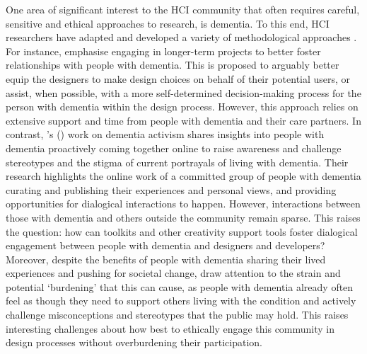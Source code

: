 One area of significant interest to the HCI community that often requires careful, sensitive and ethical approaches to research, is dementia. To this end, HCI researchers have adapted and developed a variety of methodological approaches \citep{brankaert_intersections_2019,dixon_approach_2020,houben_foregrounding_2019,unbehaun_facilitating_2018,wallace_design-led_2013}. For instance, \cite{hendriks_challenges_2014} emphasise engaging in longer-term projects to better foster relationships with people with dementia. This is proposed to arguably better equip the designers to make design choices on behalf of their potential users, or assist, when possible, with a more self-determined decision-making process for the person with dementia within the design process. However, this approach relies on extensive support and time from people with dementia and their care partners. In contrast, \citeauthor{lazar_safe_2019}'s (\citeyear{lazar_safe_2019}) work on dementia activism shares insights into people with dementia proactively coming together online to raise awareness and challenge stereotypes and the stigma of current portrayals of living with dementia. Their research highlights the online work of a committed group of people with dementia curating and publishing their experiences and personal views, and providing opportunities for dialogical interactions to happen. However, interactions between those with dementia and others outside the community remain sparse. This raises the question: how can toolkits and other creativity support tools foster dialogical engagement between people with dementia and designers and developers? Moreover, despite the benefits of people with dementia sharing their lived experiences and pushing for societal change, \cite{johnson_older_2019} draw attention to the strain and potential `burdening' that this can cause, as people with dementia already often feel as though they need to support others living with the condition and actively challenge misconceptions and stereotypes that the public may hold. This raises interesting challenges about how best to ethically engage this community in design processes without overburdening their participation.

